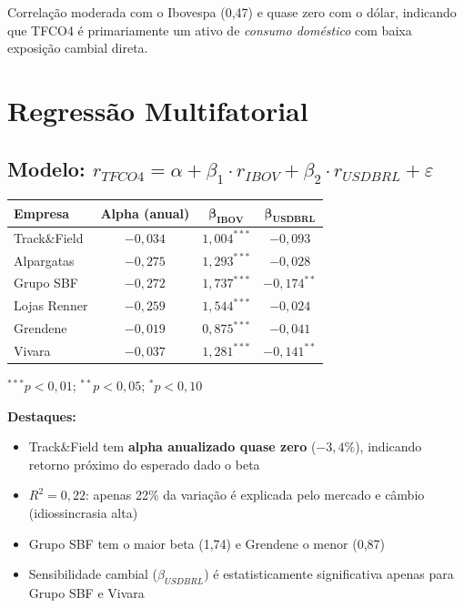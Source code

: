 \documentclass[12pt, a4paper]{article}
\begin{document}
Correlação moderada com o Ibovespa (0,47) e quase zero com o dólar, indicando que TFCO4 é primariamente um ativo de \textit{consumo doméstico} com baixa exposição cambial direta.

\section{Regressão Multifatorial}

\subsection{Modelo: $r_{TFCO4} = \alpha + \beta_1 \cdot r_{IBOV} + \beta_2 \cdot r_{USDBRL} + \varepsilon$}

\begin{center}
\begin{tabular}{lccc}
\toprule
\textbf{Empresa} & \textbf{Alpha (anual)} & $\boldsymbol{\beta_{IBOV}}$ & $\boldsymbol{\beta_{USDBRL}}$ \\
\midrule
\rowcolor{cinzatabela}
Track\&Field & $-0,034$ & $1,004^{***}$ & $-0,093$ \\
Alpargatas & $-0,275$ & $1,293^{***}$ & $-0,028$ \\
\rowcolor{cinzatabela}
Grupo SBF & $-0,272$ & $1,737^{***}$ & $-0,174^{**}$ \\
Lojas Renner & $-0,259$ & $1,544^{***}$ & $-0,024$ \\
\rowcolor{cinzatabela}
Grendene & $-0,019$ & $0,875^{***}$ & $-0,041$ \\
Vivara & $-0,037$ & $1,281^{***}$ & $-0,141^{**}$ \\
\bottomrule
\end{tabular}
\end{center}

{\footnotesize $^{***}p < 0,01$; $^{**}p < 0,05$; $^{*}p < 0,10$}

\textbf{Destaques:}
\begin{itemize}[leftmargin=*]
    \item Track\&Field tem \textbf{alpha anualizado quase zero} ($-3,4\%$), indicando retorno próximo do esperado dado o beta
    \item $R^2 = 0,22$: apenas 22\% da variação é explicada pelo mercado e câmbio (idiossincrasia alta)
    \item Grupo SBF tem o maior beta (1,74) e Grendene o menor (0,87)
    \item Sensibilidade cambial ($\beta_{USDBRL}$) é estatisticamente significativa apenas para Grupo SBF e Vivara
\end{itemize}
\end{document}

